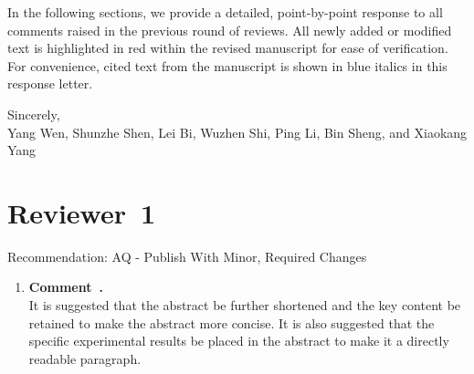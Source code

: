 \documentclass[11pt]{article}
\newcommand{\reviewersection}[1]{\section*{Reviewer~#1}}
\newcommand{\commentitem}{\item \textbf{Comment~\arabic{enumi}.}\\\ignorespaces}
\begin{document}
In the following sections, we provide a detailed, point-by-point response to all comments raised in the previous round of reviews.
All newly added or modified text is highlighted in {\color{red}red} within the revised manuscript for ease of verification.
For convenience, cited text from the manuscript is shown in {\color{blue}blue} italics in this response letter.

Sincerely,\\
Yang Wen, Shunzhe Shen, Lei Bi, Wuzhen Shi, Ping Li, Bin Sheng, and Xiaokang Yang

\reviewersection{1}
Recommendation: AQ - Publish With Minor, Required Changes
\begin{enumerate}
    \commentitem It is suggested that the abstract be further shortened and the key content be retained to make the abstract more concise. It is also suggested that the specific experimental results be placed in the abstract to make it a directly readable paragraph.
    

\end{enumerate}
\end{document}

